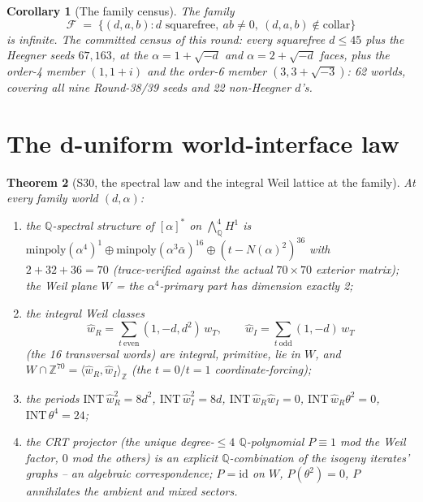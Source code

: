 \documentclass[11pt]{article}
\newtheorem{theorem}{Theorem}[section]
\newtheorem{corollary}[theorem]{Corollary}
\begin{document}
\begin{corollary}[The family census]
The family
\[
\mathcal{F} \;=\; \{(d, a, b) : d \text{ squarefree},\ ab \neq 0,\ (d, a,
b) \notin \text{collar}\}
\]
is infinite. The committed census of this round: every squarefree
$d \leq 45$ plus the Heegner seeds $67, 163$, at the $\alpha =
1+\sqrt{-d}$ and $\alpha = 2+\sqrt{-d}$ faces, plus the order-4 member
$(1, 1+i)$ and the order-6 member $(3, 3+\sqrt{-3})$: 62 worlds, covering
all nine Round-38/39 seeds and 22 non-Heegner $d$'s.
\end{corollary}

\section{The d-uniform world-interface law}

\begin{theorem}[S30, the spectral law and the integral Weil lattice at the
family]\label{thm:s30}
At every family world $(d, \alpha)$:
\begin{enumerate}
\item[(i)] the $\mathbb{Q}$-spectral structure of $[\alpha]^*$ on
$\bigwedge^4_\mathbb{Q} H^1$ is
$\mathrm{minpoly}(\alpha^4)^{1} \oplus \mathrm{minpoly}(\alpha^3\bar\alpha)^{16} \oplus
(t - N(\alpha)^2)^{36}$ with $2 + 32 + 36 = 70$ (trace-verified against
the actual $70\times 70$ exterior matrix); the Weil plane $W$ = the
$\alpha^4$-primary part has dimension exactly 2;
\item[(ii)] the integral Weil classes
\[
\hat w_R = \sum_{t\ \mathrm{even}} (1, -d, d^2)\, w_T, \qquad
\hat w_I = \sum_{t\ \mathrm{odd}} (1, -d)\, w_T
\]
(the 16 transversal words) are integral, primitive, lie in $W$, and
$W \cap \mathbb{Z}^{70} = \langle \hat w_R, \hat w_I\rangle_\mathbb{Z}$
(the $t=0/t=1$ coordinate-forcing);
\item[(iii)] the periods
$\mathrm{INT}\,\hat w_R^2 = 8d^2$, $\mathrm{INT}\,\hat w_I^2 = 8d$,
$\mathrm{INT}\,\hat w_R\hat w_I = 0$,
$\mathrm{INT}\,\hat w_R\theta^2 = 0$, $\mathrm{INT}\,\theta^4 = 24$;
\item[(iv)] the CRT projector (the unique degree-$\leq 4$
$\mathbb{Q}$-polynomial $P \equiv 1$ mod the Weil factor, $0$ mod the
others) is an explicit $\mathbb{Q}$-combination of the isogeny iterates'
graphs -- an algebraic correspondence; $P = \mathrm{id}$ on $W$,
$P(\theta^2) = 0$, $P$ annihilates the ambient and mixed sectors.
\end{enumerate}
\end{theorem}
\end{document}

